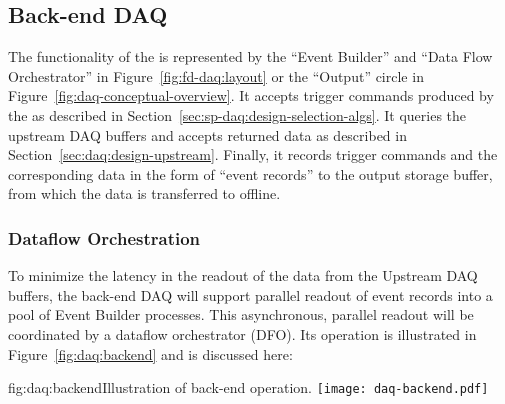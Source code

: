 \subsection{Back-end DAQ}
\label{sec:fd-daq:design-backend}

The functionality of the  is represented by the ``Event Builder'' and ``Data Flow Orchestrator'' in Figure~\ref{fig:fd-daq:layout} or the ``Output'' circle in Figure~\ref{fig:daq-conceptual-overview}. 
It accepts trigger commands produced by the  as described in Section~\ref{sec:sp-daq:design-selection-algs}. 
It queries the upstream DAQ buffers and accepts returned data as described in Section~\ref{sec:daq:design-upstream}. 
Finally, it records trigger commands and the corresponding data in the
form of ``event records'' to the output storage buffer, from which the data is transferred to offline.

\subsubsection{Dataflow Orchestration}

To minimize the latency in the readout of the data from the Upstream
DAQ buffers, the back-end DAQ will support parallel readout of event
records into a pool of Event Builder processes.  This asynchronous, parallel readout will be coordinated by a dataflow orchestrator (DFO).  Its operation is illustrated in Figure~\ref{fig:daq:backend} and is discussed here:

\begin{dunefigure}{fig:daq:backend}{Illustration of   back-end operation.}
  \texttt{[image: daq-backend.pdf]}
\end{dunefigure}



